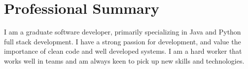 \section{Professional Summary}


I am a graduate software developer, primarily specializing in Java and Python full stack development. I have a strong passion for development, and value the importance of clean code and well developed systems. 
I am a hard worker that works well in teams and am always keen to pick up new skills and technologies.